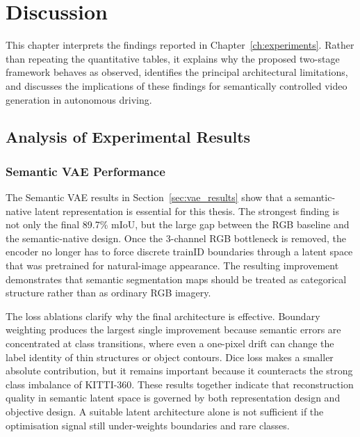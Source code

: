 \chapter{Discussion}
\label{ch:discussion}

This chapter interprets the findings reported in Chapter~\ref{ch:experiments}. Rather than repeating the quantitative tables, it explains why the proposed two-stage framework behaves as observed, identifies the principal architectural limitations, and discusses the implications of these findings for semantically controlled video generation in autonomous driving.

\FloatBarrier
\section{Analysis of Experimental Results}
\label{sec:result_analysis}

\subsection{Semantic VAE Performance}
\label{subsec:vae_analysis}

The Semantic VAE results in Section~\ref{sec:vae_results} show that a semantic-native latent representation is essential for this thesis. The strongest finding is not only the final 89.7\% mIoU, but the large gap between the RGB baseline and the semantic-native design. Once the 3-channel RGB bottleneck is removed, the encoder no longer has to force discrete trainID boundaries through a latent space that was pretrained for natural-image appearance. The resulting improvement demonstrates that semantic segmentation maps should be treated as categorical structure rather than as ordinary RGB imagery.

The loss ablations clarify why the final architecture is effective. Boundary weighting produces the largest single improvement because semantic errors are concentrated at class transitions, where even a one-pixel drift can change the label identity of thin structures or object contours. Dice loss makes a smaller absolute contribution, but it remains important because it counteracts the strong class imbalance of KITTI-360. These results together indicate that reconstruction quality in semantic latent space is governed by both representation design and objective design. A suitable latent architecture alone is not sufficient if the optimisation signal still under-weights boundaries and rare classes.


